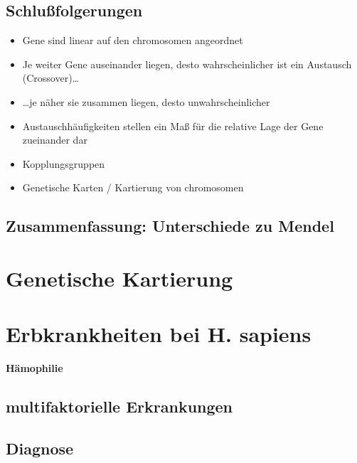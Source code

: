 \subsection{Schlußfolgerungen}\label{subsec:schlufolgerungen}
\begin{itemize}
    \item Gene sind linear auf den \gls{chromosom}en angeordnet
    \item Je weiter Gene auseinander liegen, desto
    wahrscheinlicher ist ein Austausch (Crossover)\ldots
    \item \ldots je näher sie zusammen liegen, desto
    unwahrscheinlicher
    \item Austauschhäufigkeiten stellen ein Maß für die relative
    Lage der Gene zueinander dar
    \item Kopplungsgruppen
    \item Genetische Karten / Kartierung von \gls{chromosom}en
\end{itemize}

\subsection{Zusammenfassung: Unterschiede zu Mendel}\label{subsec:zusammenfassung:-unterschiede-zu-mendel}

\section{Genetische Kartierung}\label{sec:genetische-kartierung}


\section{Erbkrankheiten bei H. sapiens}\label{sec:erbkrankheiten-bei-h.-sapiens}
\begin{bsp}
    \textbf{Hämophilie}
\end{bsp}
\subsection{multifaktorielle Erkrankungen}\label{subsec:multifaktorielle-erkrankungen}
\subsection{Diagnose}\label{subsec:diagnose}

